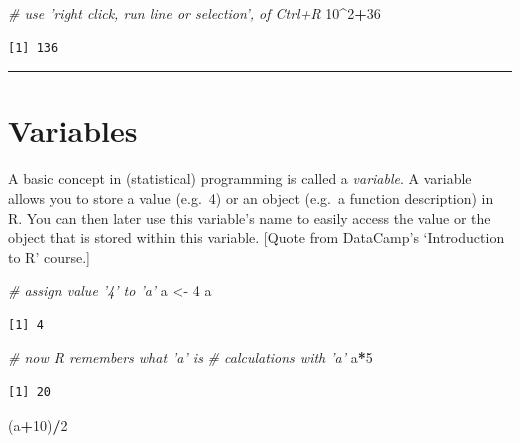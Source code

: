 \documentclass[
]{book}
\newenvironment{Shaded}{\begin{snugshade}}{\end{snugshade}}
\newcommand{\CommentTok}[1]{\textcolor[rgb]{0.56,0.35,0.01}{\textit{#1}}}
\newcommand{\DecValTok}[1]{\textcolor[rgb]{0.00,0.00,0.81}{#1}}
\newcommand{\NormalTok}[1]{#1}
\newcommand{\OperatorTok}[1]{\textcolor[rgb]{0.81,0.36,0.00}{\textbf{#1}}}
\newcommand{\StringTok}[1]{\textcolor[rgb]{0.31,0.60,0.02}{#1}}
\begin{document}
\begin{Shaded}
\begin{Highlighting}[]
\CommentTok{# use 'right click, run line or selection', of Ctrl+R}
\DecValTok{10}\OperatorTok{^}\DecValTok{2}\OperatorTok{+}\DecValTok{36}
\end{Highlighting}
\end{Shaded}

\begin{verbatim}
[1] 136
\end{verbatim}

\begin{center}\rule{0.5\linewidth}{0.5pt}\end{center}

\hypertarget{variables}{%
\section{Variables}\label{variables}}

A basic concept in (statistical) programming is called a \emph{variable}.
A variable allows you to store a value (e.g.~4) or an object (e.g.~a function description) in R. You can then later use this variable's name to easily access the value or the object that is stored within this variable. {[}Quote from DataCamp's `Introduction to R' course.{]}

\begin{Shaded}
\begin{Highlighting}[]
\CommentTok{# assign value '4' to 'a'}
\NormalTok{a <-}\StringTok{ }\DecValTok{4}
\NormalTok{a}
\end{Highlighting}
\end{Shaded}

\begin{verbatim}
[1] 4
\end{verbatim}

\begin{Shaded}
\begin{Highlighting}[]
\CommentTok{# now R remembers what 'a' is}
\CommentTok{# calculations with 'a'}
\NormalTok{a}\OperatorTok{*}\DecValTok{5}
\end{Highlighting}
\end{Shaded}

\begin{verbatim}
[1] 20
\end{verbatim}

\begin{Shaded}
\begin{Highlighting}[]
\NormalTok{(a}\OperatorTok{+}\DecValTok{10}\NormalTok{)}\OperatorTok{/}\DecValTok{2}
\end{Highlighting}
\end{Shaded}
\end{document}
